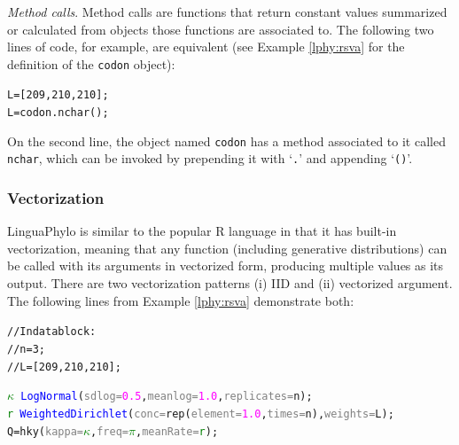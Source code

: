 \documentclass[10pt,letterpaper,table]{article}
\begin{document}
\noindent \emph{Method calls}. Method calls are functions that return
constant values summarized or calculated from objects those functions
are associated to.
The following two lines of code, for example, are equivalent (see
Example \ref{lphy:rsva} for the definition of the \texttt{codon}
object):

{\small
  \begin{alltt}
    L = [209, 210, 210];
    L = codon.nchar();
  \end{alltt}
}

On the second line, the object named \texttt{codon} has a method
associated to it called \texttt{nchar}, which can be invoked by
prepending it with `\texttt{.}' and appending `\texttt{()}'.

\subsubsection*{Vectorization}
LinguaPhylo is similar to the popular R language \cite{R} in that it
has built-in vectorization, meaning that any function (including
generative distributions) can be called with its arguments in
vectorized form, producing multiple values as its output. 
There are two vectorization patterns (i) IID and (ii) vectorized
argument.
The following lines from Example \ref{lphy:rsva} demonstrate both:
{\small
  \begin{alltt}
    // In data block:
    // n = 3;
    // L = [209, 210, 210];

    \textcolor{green}{\(\kappa\)} ~ \textcolor{blue}{LogNormal}(\textcolor{gray}{sdlog=}\textcolor{magenta}{0.5}, \textcolor{gray}{meanlog=}\textcolor{magenta}{1.0}, \textcolor{gray}{replicates=}n);
    \textcolor{green}{r} ~ \textcolor{blue}{WeightedDirichlet}(\textcolor{gray}{conc=}\textcolor{magenta!80!black}{rep}(\textcolor{gray}{element=}\textcolor{magenta}{1.0}, \textcolor{gray}{times=}n), \textcolor{gray}{weights=}L);
    Q = \textcolor{magenta!80!black}{hky}(\textcolor{gray}{kappa=}\textcolor{green}{\(\kappa\)}, \textcolor{gray}{freq=}\textcolor{green}{\(\pi\)}, \textcolor{gray}{meanRate=}\textcolor{green}{r});
  \end{alltt}
}
\end{document}
